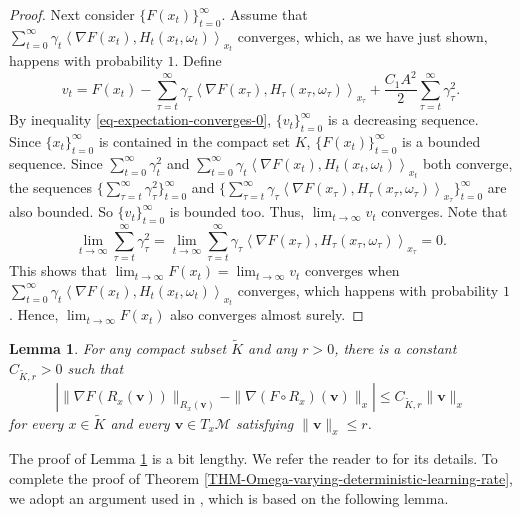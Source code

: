 \documentclass{amsart}
\newcommand{\M}{\mathcal{M}}
\newcommand{\g}{\gamma}
\theoremstyle{plain}
\newtheorem{lemma}[theorem]{Lemma}
\theoremstyle{definition}
\theoremstyle{remark}
\numberwithin{theorem}{section}
\numberwithin{equation}{section}
\begin{document}
\begin{proof}
Next consider $\{F(x_t)\}_{t=0}^\infty$. Assume that $\sum_{t=0}^\infty \g_t \left\langle \nabla F(x_t), H_t(x_t,\omega_t)\right\rangle_{x_t}$ converges, which, as we have just shown, happens with probability $1$. Define 
\[
v_t = F(x_t) -\sum_{\tau=t}^\infty \g_\tau \left\langle \nabla F(x_\tau), H_\tau (x_\tau,\omega_\tau)\right\rangle_{x_\tau} + \frac{C_1 A^2}{2} \sum_{\tau=t}^\infty \g_\tau^2.
\]
By inequality \eqref{eq-expectation-converges-0}, $\{v_t\}_{t=0}^\infty$ is a decreasing sequence. Since $\{x_t\}_{t=0}^\infty$ is contained in the compact set $K$, $\{F(x_t)\}_{t=0}^\infty$ is a bounded sequence. Since $\sum_{t=0}^\infty \g_t^2$ and $\sum_{t=0}^\infty \g_t\left\langle \nabla F(x_t), H_t(x_t,\omega_t)\right\rangle_{x_t}$ both converge, the sequences $\{\sum_{\tau=t}^\infty \g_\tau^2\}_{t=0}^\infty$ and $\{\sum_{\tau=t}^\infty \g_\tau \left\langle \nabla F(x_\tau), H_\tau (x_\tau,\omega_\tau)\right\rangle_{x_\tau}\}_{t=0}^\infty$ are also bounded. So $\{v_t\}_{t=0}^\infty$ is bounded too. Thus, $\lim_{t \rightarrow \infty} v_t$ converges. Note that 
\[
\lim_{t \rightarrow \infty} \sum_{\tau=t}^\infty \g_\tau^2 = \lim_{t \rightarrow \infty} \sum_{\tau=t}^\infty \g_\tau \left\langle \nabla F(x_\tau), H_\tau(x_\tau,\omega_\tau)\right\rangle_{x_\tau} =0.
\]
This shows that $\lim_{t\rightarrow \infty} F(x_t) = \lim_{t \rightarrow \infty} v_t$ converges when $\sum_{t=0}^\infty \g_t \left\langle \nabla F(x_t), H_t(x_t,\omega_t)\right\rangle_{x_t}$ converges, which happens with probability $1$. Hence, $\lim_{t\rightarrow \infty} F(x_t)$ also converges almost surely.
\end{proof}

\begin{lemma}\cite[Lemmas 2.15]{YXW-2024}\label{lemma-gradient-difference}
For any compact subset $\widetilde{K}$ and any $r>0$, there is a constant $C_{\widetilde{K},r}>0$ such that 
\[
\left|\|\nabla F (R_x(\mathbf{v}))\|_{R_x(\mathbf{v})} - \|\nabla(F\circ R_x)(\mathbf{v})\|_x\right| \leq C_{\widetilde{K},r} \|\mathbf{v}\|_x
\] 
for every $x \in \widetilde{K}$ and every $\mathbf{v} \in T_x \M$ satisfying $\|\mathbf{v}\|_x \leq r$.
\end{lemma}

The proof of Lemma \ref{lemma-gradient-difference} is a bit lengthy. We refer the reader to \cite[Lemmas 2.11-15]{YXW-2024} for its details. To complete the proof of Theorem \ref{THM-Omega-varying-deterministic-learning-rate}, we adopt an argument used in \cite{Alber-Iusem-Solodov,Li-Orabona,Mairal}, which is based on the following lemma.
\end{document}
